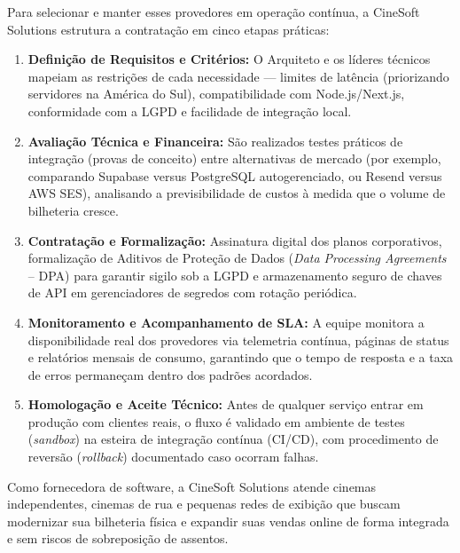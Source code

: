 
Para selecionar e manter esses provedores em operação contínua, a CineSoft Solutions estrutura a contratação em cinco etapas práticas:

\begin{enumerate}
\item \textbf{Definição de Requisitos e Critérios:} O Arquiteto e os líderes técnicos mapeiam as restrições de cada necessidade — limites de latência (priorizando servidores na América do Sul), compatibilidade com Node.js/Next.js, conformidade com a LGPD e facilidade de integração local.
\item \textbf{Avaliação Técnica e Financeira:} São realizados testes práticos de integração (provas de conceito) entre alternativas de mercado (por exemplo, comparando Supabase versus PostgreSQL autogerenciado, ou Resend versus AWS SES), analisando a previsibilidade de custos à medida que o volume de bilheteria cresce.
\item \textbf{Contratação e Formalização:} Assinatura digital dos planos corporativos, formalização de Aditivos de Proteção de Dados (\emph{Data Processing Agreements} – DPA) para garantir sigilo sob a LGPD e armazenamento seguro de chaves de API em gerenciadores de segredos com rotação periódica.
\item \textbf{Monitoramento e Acompanhamento de SLA:} A equipe monitora a disponibilidade real dos provedores via telemetria contínua, páginas de status e relatórios mensais de consumo, garantindo que o tempo de resposta e a taxa de erros permaneçam dentro dos padrões acordados.
\item \textbf{Homologação e Aceite Técnico:} Antes de qualquer serviço entrar em produção com clientes reais, o fluxo é validado em ambiente de testes (\emph{sandbox}) na esteira de integração contínua (CI/CD), com procedimento de reversão (\emph{rollback}) documentado caso ocorram falhas.
\end{enumerate}


Como fornecedora de software, a CineSoft Solutions atende cinemas independentes, cinemas de rua e pequenas redes de exibição que buscam modernizar sua bilheteria física e expandir suas vendas online de forma integrada e sem riscos de sobreposição de assentos.



